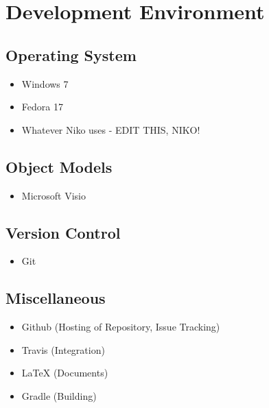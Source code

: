 \section{Development Environment}

\subsection*{Operating System}
\begin{itemize}
\item Windows 7
\item Fedora 17
\item Whatever Niko uses - EDIT THIS, NIKO!
\end{itemize}
\subsection*{Object Models}
\begin{itemize}
\item Microsoft Visio
\end{itemize}
\subsection*{Version Control}
\begin{itemize}
\item Git
\end{itemize}
\subsection*{Miscellaneous}
\begin{itemize}
\item Github (Hosting of Repository, Issue Tracking)
\item Travis (Integration)
\item {\LaTeX} (Documents)
\item Gradle (Building) 
\end{itemize}